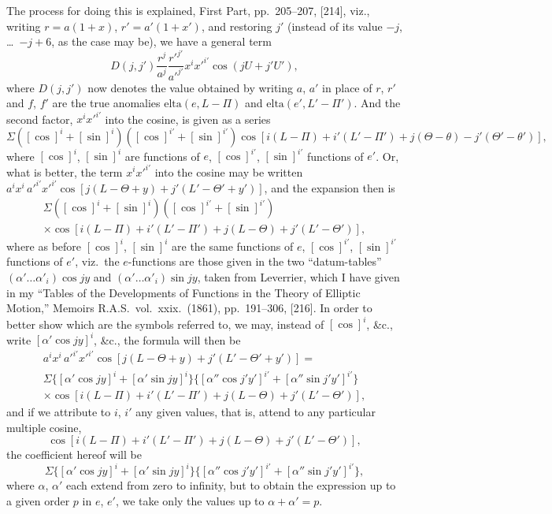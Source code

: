 \documentclass[11pt,a4paper]{article}
\theoremstyle{plain}
\theoremstyle{definition}
\theoremstyle{remark}
\begin{document}
The process for doing this is explained, First Part, pp.~205--207, [214], viz., writing $r=a(1+x)$, $r'=a'(1+x')$, and restoring $j'$ (instead of its value $-j$, \dots\ $-j+6$, as the case may be), we have a general term
\[
D(j,j')\frac{r^{j}}{a^{j}}\frac{r'^{j'}}{a'^{j'}}x^{i}x'^{i'}\cos(jU+j'U'),
\]
where $D(j,j')$ now denotes the value obtained by writing $a$, $a'$ in place of $r$, $r'$ and $f$, $f'$ are the true anomalies $\text{elta}(e,L-\Pi)$ and $\text{elta}(e',L'-\Pi')$. And the second factor, $x^{i}x'^{i'}$ into the cosine, is given as a series
\[
\Sigma([\cos]^{i}+[\sin]^{i})([\cos]^{i'}+[\sin]^{i'})\cos[i(L-\Pi)+i'(L'-\Pi')+j(\Theta-\theta)-j'(\Theta'-\theta')],
\]
where $[\cos]^{i}$, $[\sin]^{i}$ are functions of $e$, $[\cos]^{i'}$, $[\sin]^{i'}$ functions of $e'$. Or, what is better, the term $x^{i}x'^{i'}$ into the cosine may be written $a^{i}x^{i}\,a'^{i'}x'^{i'}\cos[j(L-\Theta+y)+j'(L'-\Theta'+y')]$, and the expansion then is
\begin{multline*}
\Sigma([\cos]^{i}+[\sin]^{i})([\cos]^{i'}+[\sin]^{i'})\\
\times\cos[i(L-\Pi)+i'(L'-\Pi')+j(L-\Theta)+j'(L'-\Theta')],
\end{multline*}
where as before $[\cos]^{i}$, $[\sin]^{i}$ are the same functions of $e$, $[\cos]^{i'}$, $[\sin]^{i'}$ functions of $e'$, viz.\ the $e$-functions are those given in the two ``datum-tables'' $(\alpha'\dots\alpha'_{i})\cos jy$ and $(\alpha'\dots\alpha'_{i})\sin jy$, taken from Leverrier, which I have given in my ``Tables of the Developments of Functions in the Theory of Elliptic Motion,'' Memoirs R.A.S.\ vol.~xxix.\ (1861), pp.~191--306, [216]. In order to better show which are the symbols referred to, we may, instead of $[\cos]^{i}$, \&c., write $[\alpha'\cos jy]^{i}$, \&c., the formula will then be
\begin{multline*}
a^{i}x^{i}\,a'^{i'}x'^{i'}\cos[j(L-\Theta+y)+j'(L'-\Theta'+y')] =\\
\Sigma\{[\alpha'\cos jy]^{i}+[\alpha'\sin jy]^{i}\}\{[\alpha''\cos j'y']^{i'}+[\alpha''\sin j'y']^{i'}\}\\
\times\cos[i(L-\Pi)+i'(L'-\Pi')+j(L-\Theta)+j'(L'-\Theta')],
\end{multline*}
and if we attribute to $i$, $i'$ any given values, that is, attend to any particular multiple cosine,
\[
\cos[i(L-\Pi)+i'(L'-\Pi')+j(L-\Theta)+j'(L'-\Theta')],
\]
the coefficient hereof will be
\[
\Sigma\{[\alpha'\cos jy]^{i}+[\alpha'\sin jy]^{i}\}\{[\alpha''\cos j'y']^{i'}+[\alpha''\sin j'y']^{i'}\},
\]
where $\alpha$, $\alpha'$ each extend from zero to infinity, but to obtain the expression up to a given order $p$ in $e$, $e'$, we take only the values up to $\alpha+\alpha'=p$.
\end{document}
